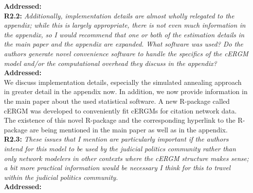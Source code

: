 \documentclass[a4paper,11pt]{texMemo}
\begin{document}
\noindent \textbf{Addressed:}  \\

\noindent \textbf{R2.2:} \emph{ Additionally, implementation details are almost wholly relegated to the appendix; while this is largely appropriate, there is not even much information in the appendix, so I would recommend that one or both of the estimation details in the main paper and the appendix are expanded. What software was used? Do the authors generate novel convenience software to handle the specifics of the cERGM model and/or the computational overhead they discuss in the appendix?}\\

\noindent \textbf{Addressed:}  \\
We discuss implementation details, especially the simulated annealing approach in greater detail in the appendix now. In addition, we now provide information in the main paper about the used statistical software. A new R-package called cERGM was developed to conveniently fit cERGMs for citation network data. The existence of this novel R-package and the corresponding hyperlink to the R-package are being mentioned in the main paper as well as in the appendix. \\

\noindent \textbf{R2.3:} \emph{ These issues that I mention are particularly important if the authors intend for this model to be used by the judicial politics community rather than only network modelers in other contexts where the cERGM structure makes sense; a bit more practical information would be necessary I think for this to travel within the judicial politics community.}\\

\noindent \textbf{Addressed:}  \\
\end{document}
